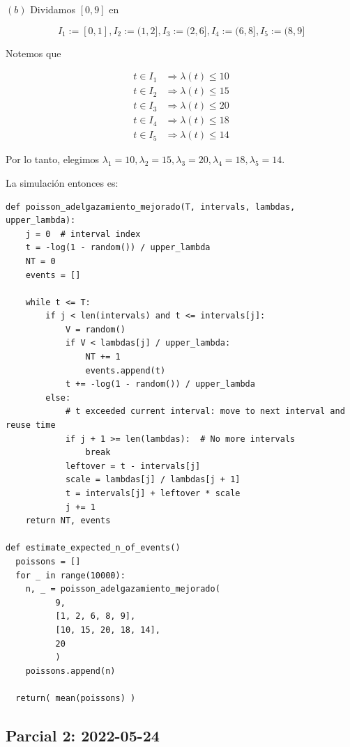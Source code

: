 \documentclass[a4paper, 12pt]{article}
\begin{document}
$(b)$ Dividamos $[0, 9]$ en 

\begin{equation*}
  I_1 := [0, 1], I_2 := (1, 2], I_3 := (2, 6], I_4 := (6, 8], I_5 := (8, 9]
\end{equation*}

Notemos que 

\begin{align*}
  t \in I_1 &\Rightarrow \lambda(t) \leq 10 \\ 
  t \in I_2 &\Rightarrow \lambda(t) \leq 15 \\ 
  t \in I_3 &\Rightarrow \lambda(t) \leq 20 \\ 
  t \in I_4 &\Rightarrow\lambda(t) \leq 18\\
  t \in I_5 & \Rightarrow \lambda(t) \leq 14
\end{align*}

Por lo tanto, elegimos $\lambda_1 = 10, \lambda_2 = 15, \lambda_3 = 20,
\lambda_4 = 18, \lambda_5 = 14$. 

La simulación entonces es:

\pagebreak 

\begin{verbatim}
def poisson_adelgazamiento_mejorado(T, intervals, lambdas, upper_lambda):
    j = 0  # interval index
    t = -log(1 - random()) / upper_lambda
    NT = 0
    events = []

    while t <= T:
        if j < len(intervals) and t <= intervals[j]:
            V = random()
            if V < lambdas[j] / upper_lambda:
                NT += 1
                events.append(t)
            t += -log(1 - random()) / upper_lambda
        else:
            # t exceeded current interval: move to next interval and reuse time
            if j + 1 >= len(lambdas):  # No more intervals
                break
            leftover = t - intervals[j]
            scale = lambdas[j] / lambdas[j + 1]
            t = intervals[j] + leftover * scale
            j += 1
    return NT, events

def estimate_expected_n_of_events()
  poissons = [] 
  for _ in range(10000):
    n, _ = poisson_adelgazamiento_mejorado(
          9, 
          [1, 2, 6, 8, 9], 
          [10, 15, 20, 18, 14],
          20
          )
    poissons.append(n)
  
  return( mean(poissons) )

\end{verbatim}


\pagebreak 

\subsection{Parcial 2: 2022-05-24}
\end{document}
